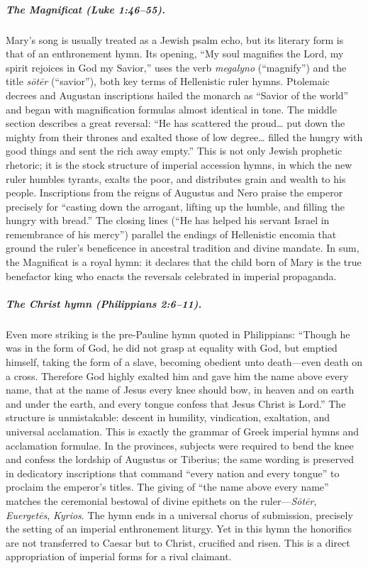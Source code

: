 \subparagraph{The Magnificat (Luke 1:46–55).}
Mary’s song is usually treated as a Jewish psalm echo, but its literary form is that of an enthronement hymn.
Its opening, “My soul magnifies the Lord, my spirit rejoices in God my Savior,” uses the verb \emph{megalyno} (“magnify”) and the title \emph{sōtēr} (“savior”), both key terms of Hellenistic ruler hymns.
Ptolemaic decrees and Augustan inscriptions hailed the monarch as “Savior of the world” and began with magnification formulas almost identical in tone.
The middle section describes a great reversal: “He has scattered the proud… put down the mighty from their thrones and exalted those of low degree… filled the hungry with good things and sent the rich away empty.”
This is not only Jewish prophetic rhetoric; it is the stock structure of imperial accession hymns, in which the new ruler humbles tyrants, exalts the poor, and distributes grain and wealth to his people.
Inscriptions from the reigns of Augustus and Nero praise the emperor precisely for “casting down the arrogant, lifting up the humble, and filling the hungry with bread.”
The closing lines (“He has helped his servant Israel in remembrance of his mercy”) parallel the endings of Hellenistic encomia that ground the ruler’s beneficence in ancestral tradition and divine mandate.
In sum, the Magnificat is a royal hymn: it declares that the child born of Mary is the true benefactor king who enacts the reversals celebrated in imperial propaganda.

\subparagraph{The Christ hymn (Philippians 2:6–11).}
Even more striking is the pre-Pauline hymn quoted in Philippians:
“Though he was in the form of God, he did not grasp at equality with God,
but emptied himself, taking the form of a slave,
becoming obedient unto death—even death on a cross.
Therefore God highly exalted him
and gave him the name above every name,
that at the name of Jesus every knee should bow,
in heaven and on earth and under the earth,
and every tongue confess that Jesus Christ is Lord.”
The structure is unmistakable: descent in humility, vindication, exaltation, and universal acclamation.
This is exactly the grammar of Greek imperial hymns and acclamation formulae.
In the provinces, subjects were required to bend the knee and confess the lordship of Augustus or Tiberius; the same wording is preserved in dedicatory inscriptions that command “every nation and every tongue” to proclaim the emperor’s titles.
The giving of “the name above every name” matches the ceremonial bestowal of divine epithets on the ruler—\emph{Sōtēr}, \emph{Euergetēs}, \emph{Kyrios}.
The hymn ends in a universal chorus of submission, precisely the setting of an imperial enthronement liturgy.
Yet in this hymn the honorifics are not transferred to Caesar but to Christ, crucified and risen.
This is a direct appropriation of imperial forms for a rival claimant.

